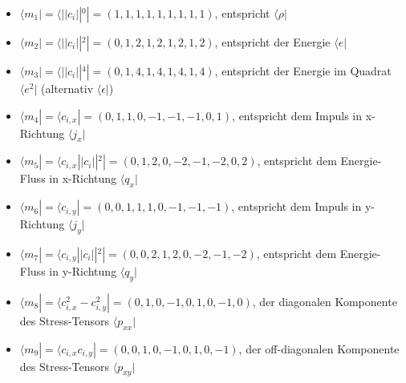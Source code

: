 \documentclass[a4paper,10pt]{scrreprt}
\begin{document}
\begin{itemize}
 \item $ \langle m_1 | =  \langle ||c_i||^0 | = (1,1,1,1,1,1,1,1,1)$, entspricht $\langle \rho |$ 
 \item $ \langle m_2 | =  \langle ||c_i||^2 | = (0,1,2,1,2,1,2,1,2)$, entspricht der Energie $\langle e|$
 \item $ \langle m_3 | =  \langle ||c_i||^4 | = (0,1,4,1,4,1,4,1,4)$, entspricht der Energie im Quadrat $\langle e^2|$ (alternativ $\langle \epsilon|$)
 \item $ \langle m_4 | =  \langle c_{i,x} | = (0,1,1,0,-1,-1,-1,0,1)$, entspricht dem Impuls in x-Richtung $\langle j_x|$
 \item $ \langle m_5 | =  \langle c_{i,x} ||c_i||^2 | = (0,1,2,0,-2,-1,-2,0,2)$, entspricht dem Energie-Fluss in x-Richtung $\langle q_x |$
 \item $ \langle m_6 | =  \langle c_{i,y} | = (0,0,1,1,1,0,-1,-1,-1)$, entspricht dem Impuls in y-Richtung $\langle j_y|$
 \item $ \langle m_7 | =  \langle c_{i,y} ||c_i||^2 | = (0,0,2,1,2,0,-2,-1,-2)$, entspricht dem Energie-Fluss in y-Richtung $\langle q_y |$
 \item $ \langle m_8 | =  \langle c^2_{i,x} - c^2_{i,y}  | = (0,1,0,-1,0,1,0,-1,0)$, der diagonalen Komponente des Stress-Tensors $\langle p_{xx} |$
 \item $ \langle m_9 | =  \langle c_{i,x} c_{i,y}  | = (0,0,1,0,-1,0,1,0,-1)$, der off-diagonalen Komponente des Stress-Tensors $\langle p_{xy} |$
\end{itemize}
\end{document}

